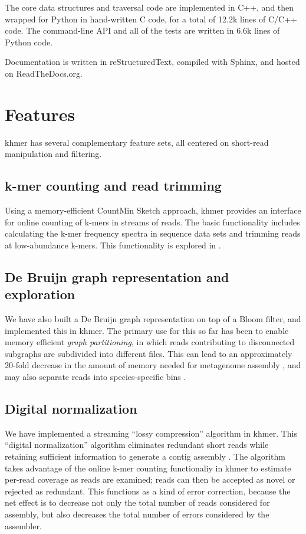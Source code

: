 \documentclass[10pt]{article}
\begin{document}
The core data structures and traversal code are implemented in C++, and
then wrapped for Python in hand-written C code, for a total of
12.2k lines of C/C++ code.  The command-line API and all of the tests
are written in 6.6k lines of Python code.

Documentation is written in reStructuredText, compiled with Sphinx, and
hosted on ReadTheDocs.org.

\section*{Features}

khmer has several complementary feature sets, all centered on short-read
manipulation and filtering.

\subsection*{k-mer counting and read trimming}

Using a memory-efficient CountMin Sketch approach, khmer provides an
interface for online counting of k-mers in streams of reads.  The
basic functionality includes calculating the k-mer frequency spectra
in sequence data sets and trimming reads at low-abundance k-mers.
This functionality is explored in \cite{Zhang2013}.

\subsection*{De Bruijn graph representation and exploration}

We have also built a De Bruijn graph representation on top of a Bloom
filter, and implemented this in khmer.  The primary use for this so
far has been to enable memory efficient {\em graph partitioning}, in
which reads contributing to disconnected subgraphs are subdivided into
different files.  This can lead to an approximately 20-fold decrease
in the amount of memory needed for metagenome assembly
\cite{Pell2012}, and may also separate reads into species-specific
bins \cite{Howe2012}.

\subsection*{Digital normalization}

We have implemented a streaming ``lossy compression'' algorithm in
khmer.  This ``digital normalization'' algorithm eliminates redundant
short reads while retaining sufficient information to generate a
contig assembly \cite{Brown2012}.  The algorithm takes advantage of the online
k-mer counting functionaliy in khmer to estimate per-read coverage as
reads are examined; reads can then be accepted as novel or rejected as
redundant. This functions as a kind of error correction, because the
net effect is to decrease not only the total number of reads considered
for assembly, but also decreases the total number of errors considered
by the assembler.
\end{document}
